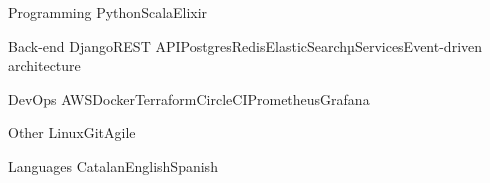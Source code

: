 

\begin{cvskills}

  \cvskill
    {Programming} %
    {Python\acvHeaderSocialSep Scala\acvHeaderSocialSep Elixir} %

  \cvskill
    {Back-end} %
    {Django\acvHeaderSocialSep REST API\acvHeaderSocialSep Postgres\acvHeaderSocialSep Redis\acvHeaderSocialSep ElasticSearch\acvHeaderSocialSep µServices\acvHeaderSocialSep Event-driven architecture} %

  \cvskill
    {DevOps} %
    {AWS\acvHeaderSocialSep Docker\acvHeaderSocialSep Terraform\acvHeaderSocialSep CircleCI\acvHeaderSocialSep Prometheus\acvHeaderSocialSep Grafana} %

  \cvskill
    {Other} %
    {Linux\acvHeaderSocialSep Git\acvHeaderSocialSep Agile} %

  \cvskill
    {Languages} %
    {Catalan\acvHeaderSocialSep English\acvHeaderSocialSep Spanish} %

\end{cvskills}

